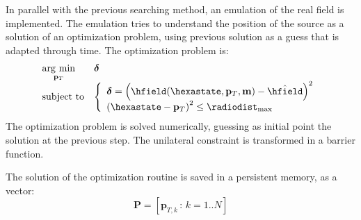 In parallel with the previous searching method, an emulation of the real field is implemented. The emulation tries to understand the position of the source as a solution of an optimization problem, using previous solution as a guess that is adapted through time. The optimization problem is:
\begin{equation}
\begin{array}{ll}
\underset{\mathbf{p}_T}{\mathrm{arg~min}} & \boldsymbol{\delta} \\
\mathrm{subject~to} & 	\left\{ \begin{array}{l}
							\boldsymbol{\delta} = \braces{\hfield(\hexastate,\mathbf{p}_T, \mathbf{m}) - \hat{\hfield}}^2 \\
							\braces{\hexastate - \mathbf{p}_T}^2  \leq  {\radiodist_{\mathrm{max}}}
						\end{array} \right. \\ 
\end{array}
\end{equation}
The optimization problem is solved numerically, guessing as initial point the solution at the previous step. The unilateral constraint is transformed in a barrier function.

The solution of the optimization routine is saved in a persistent memory, as a vector:
\[ \mathbf{P} = [ \mathbf{p}_{T,k} \,:\, k=1..N ] \]

